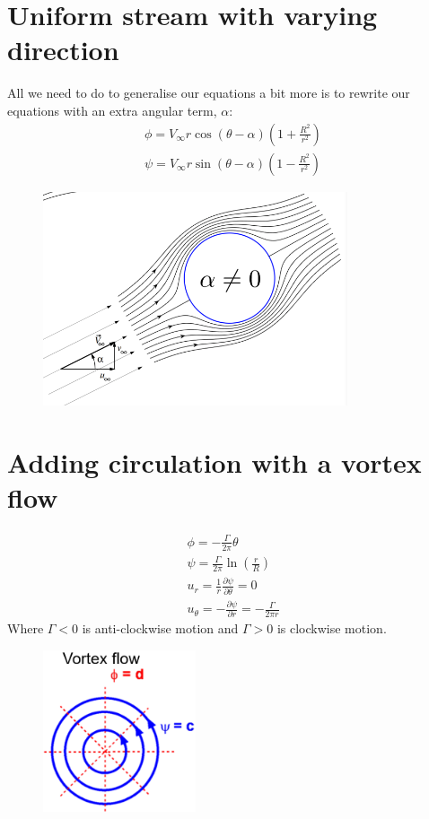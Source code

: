 \documentclass[class=report, crop=false, 12pt,a4paper]{standalone}
\begin{document}
\section{Uniform stream with varying direction}
All we need to do to generalise our equations a bit more is to rewrite our equations with an extra angular term, $\alpha$:
\begin{gather}
  \phi = V_{\infty}r\cos(\theta-\alpha)\left(1+\frac{R^2}{r^2}\right)\\
  \psi = V_{\infty}r\sin(\theta-\alpha)\left(1-\frac{R^2}{r^2}\right)
\end{gather}
\begin{figure}[H]
  \centering
  \includegraphics[width = 0.8\textwidth]{../img/diagram23.png}
\end{figure}
\section{Adding circulation with a vortex flow}
\begin{gather}
  \phi = -\frac{\Gamma}{2\pi}\theta\\
  \psi = \frac{\Gamma}{2\pi}\ln\left(\frac{r}{R}\right)\\
  u_r = \frac{1}{r}\frac{\partial \psi}{\partial \theta} = 0\\
  u_{\theta} = -\frac{\partial \psi}{\partial r} = -\frac{\Gamma}{2\pi r}
\end{gather}
Where $\Gamma < 0$ is anti-clockwise motion and $\Gamma > 0$ is clockwise motion.
\begin{figure}[H]
  \centering
  \includegraphics[width = 0.4\textwidth]{../img/diagram24.png}
\end{figure}
\end{document}
